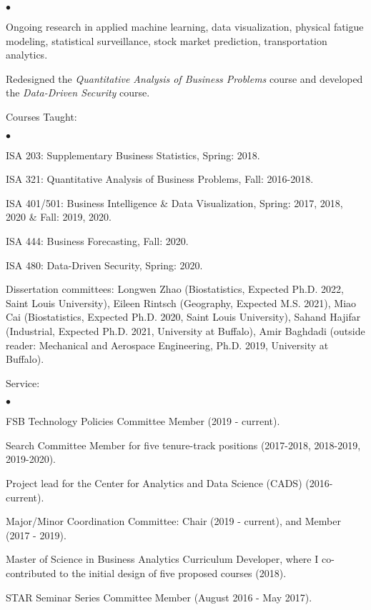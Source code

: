 \documentclass[margin,line]{res}
\newenvironment{list2}{
  \begin{list}{$\bullet$}{%
      \setlength{\itemsep}{0in}
      \setlength{\parsep}{0in} \setlength{\parskip}{0in}
      \setlength{\topsep}{0in} \setlength{\partopsep}{0in} 
      \setlength{\leftmargin}{0.2in}}}{\end{list}}
\begin{document}
\begin{resume}
\vspace{-3.5mm}
\begin{list2}
	\item Ongoing research in applied machine learning, data visualization, physical fatigue modeling, statistical surveillance, stock market prediction, transportation analytics.
	\item Redesigned the \textit{Quantitative Analysis of Business Problems} course and developed the \textit{Data-Driven Security} course.
	\item Courses Taught:
	\begin{list2}
		\item ISA 203: Supplementary Business Statistics, Spring: 2018.
		\item ISA 321: Quantitative Analysis of Business Problems, Fall: 2016-2018.
		\item ISA 401/501: Business Intelligence \& Data Visualization, Spring: 2017, 2018, 2020 \& Fall: 2019, 2020.
		\item ISA 444: Business Forecasting, Fall: 2020.
		\item ISA 480: Data-Driven Security, Spring: 2020.
	\end{list2}
	\item Dissertation committees: Longwen Zhao (Biostatistics, Expected Ph.D. 2022, Saint Louis University), Eileen Rintsch (Geography, Expected M.S. 2021), Miao Cai (Biostatistics, Expected Ph.D. 2020, Saint Louis University), Sahand Hajifar (Industrial, Expected Ph.D. 2021, University at Buffalo), Amir Baghdadi (outside reader: Mechanical and Aerospace Engineering, Ph.D. 2019, University at Buffalo).
	\item Service:
	\begin{list2}
		\item FSB Technology Policies Committee Member (2019 - current).
		\item Search Committee Member for five tenure-track positions (2017-2018, 2018-2019, 2019-2020).
		\item Project lead for the Center for Analytics and Data Science (CADS) (2016- current).
		\item Major/Minor Coordination Committee: Chair (2019 - current), and Member (2017 - 2019).
		\item Master of Science in Business Analytics Curriculum Developer, where I co-contributed to the initial design of five proposed courses (2018).
		\item STAR Seminar Series Committee Member (August 2016 - May 2017).
	\end{list2} 
\end{list2}


\end{resume}
\end{document}
